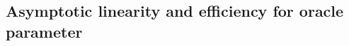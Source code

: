 \documentclass[11pt]{article}
\theoremstyle{definition}
\begin{document}
\subsection{Asymptotic linearity and efficiency for oracle parameter}
\label{section::dataAdaptParam}

 
\label{section::oracleParamInference}
 
 

 
 
 



\end{document}
